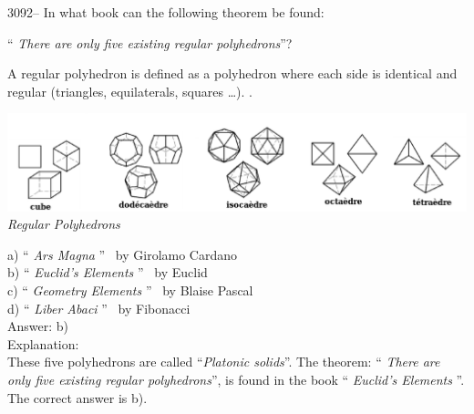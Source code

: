 \documentclass[letterpaper, 12pt]{article}
\begin{document}
3092-- In what book can the following theorem be found:
\begin{center}
`` \emph{There are only five existing regular polyhedrons}''?
\end{center}
A regular polyhedron is defined as a polyhedron where each side is identical and regular (triangles, equilaterals, squares \dots). .
\begin{center}
\includegraphics[scale=0.5]{Polyedres_reguliers.eps}\\
\emph{Regular Polyhedrons}
\end{center}

a) `` \emph{Ars Magna} '' \ by Girolamo Cardano\\
b) `` \emph{Euclid's Elements} '' \ by Euclid\\
c) `` \emph{Geometry Elements} '' \ by Blaise Pascal\\
d) `` \emph{Liber Abaci} '' \ by Fibonacci\\

Answer: b)\\

Explanation:\\
These five polyhedrons are called ``\emph{Platonic solids}''. The theorem: `` \emph{There are only five existing regular polyhedrons}'', is found in the book `` \emph{Euclid's Elements} ''. The correct answer is b).\\
\end{document}
